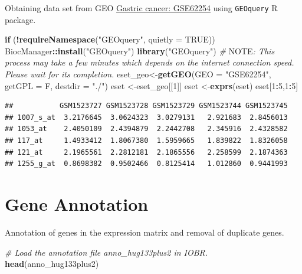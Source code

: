 \documentclass[
  12pt,
]{book}
\newenvironment{Shaded}{\begin{snugshade}}{\end{snugshade}}
\newcommand{\AlertTok}[1]{\textcolor[rgb]{0.94,0.16,0.16}{#1}}
\newcommand{\AttributeTok}[1]{\textcolor[rgb]{0.13,0.29,0.53}{#1}}
\newcommand{\CommentTok}[1]{\textcolor[rgb]{0.56,0.35,0.01}{\textit{#1}}}
\newcommand{\ConstantTok}[1]{\textcolor[rgb]{0.56,0.35,0.01}{#1}}
\newcommand{\ControlFlowTok}[1]{\textcolor[rgb]{0.13,0.29,0.53}{\textbf{#1}}}
\newcommand{\DecValTok}[1]{\textcolor[rgb]{0.00,0.00,0.81}{#1}}
\newcommand{\FunctionTok}[1]{\textcolor[rgb]{0.13,0.29,0.53}{\textbf{#1}}}
\newcommand{\NormalTok}[1]{#1}
\newcommand{\OtherTok}[1]{\textcolor[rgb]{0.56,0.35,0.01}{#1}}
\newcommand{\SpecialCharTok}[1]{\textcolor[rgb]{0.81,0.36,0.00}{\textbf{#1}}}
\newcommand{\StringTok}[1]{\textcolor[rgb]{0.31,0.60,0.02}{#1}}
\begin{document}
Obtaining data set from GEO \href{https://pubmed.ncbi.nlm.nih.gov/25894828/}{Gastric cancer: GSE62254} using \texttt{GEOquery} R package.

\begin{Shaded}
\begin{Highlighting}[]
\ControlFlowTok{if}\NormalTok{ (}\SpecialCharTok{!}\FunctionTok{requireNamespace}\NormalTok{(}\StringTok{"GEOquery"}\NormalTok{, }\AttributeTok{quietly =} \ConstantTok{TRUE}\NormalTok{))  BiocManager}\SpecialCharTok{::}\FunctionTok{install}\NormalTok{(}\StringTok{"GEOquery"}\NormalTok{)}
\FunctionTok{library}\NormalTok{(}\StringTok{"GEOquery"}\NormalTok{)}
\CommentTok{\# }\AlertTok{NOTE}\CommentTok{: This process may take a few minutes which depends on the internet connection speed. Please wait for its completion.}
\NormalTok{eset\_geo}\OtherTok{\textless{}{-}}\FunctionTok{getGEO}\NormalTok{(}\AttributeTok{GEO     =} \StringTok{"GSE62254"}\NormalTok{, }\AttributeTok{getGPL  =}\NormalTok{ F, }\AttributeTok{destdir =} \StringTok{"./"}\NormalTok{)}
\NormalTok{eset    }\OtherTok{\textless{}{-}}\NormalTok{eset\_geo[[}\DecValTok{1}\NormalTok{]]}
\NormalTok{eset    }\OtherTok{\textless{}{-}}\FunctionTok{exprs}\NormalTok{(eset)}
\NormalTok{eset[}\DecValTok{1}\SpecialCharTok{:}\DecValTok{5}\NormalTok{,}\DecValTok{1}\SpecialCharTok{:}\DecValTok{5}\NormalTok{]}
\end{Highlighting}
\end{Shaded}

\begin{verbatim}
##           GSM1523727 GSM1523728 GSM1523729 GSM1523744 GSM1523745
## 1007_s_at  3.2176645  3.0624323  3.0279131   2.921683  2.8456013
## 1053_at    2.4050109  2.4394879  2.2442708   2.345916  2.4328582
## 117_at     1.4933412  1.8067380  1.5959665   1.839822  1.8326058
## 121_at     2.1965561  2.2812181  2.1865556   2.258599  2.1874363
## 1255_g_at  0.8698382  0.9502466  0.8125414   1.012860  0.9441993
\end{verbatim}

\hypertarget{gene-annotation}{%
\section{Gene Annotation}\label{gene-annotation}}

Annotation of genes in the expression matrix and removal of duplicate genes.

\begin{Shaded}
\begin{Highlighting}[]
\CommentTok{\# Load the annotation file \textasciigrave{}anno\_hug133plus2\textasciigrave{} in IOBR.}
\FunctionTok{head}\NormalTok{(anno\_hug133plus2)}
\end{Highlighting}
\end{Shaded}
\end{document}
